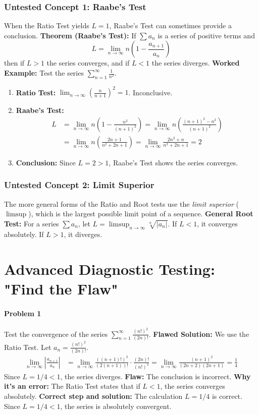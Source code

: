 \documentclass{article}
\begin{document}
\section{Untested Concept 1: Raabe's Test}
When the Ratio Test yields $L=1$, Raabe's Test can sometimes provide a conclusion.
\textbf{Theorem (Raabe's Test):} If $\sum a_n$ is a series of positive terms and
\[ L = \lim_{n \to \infty} n \left( 1 - \frac{a_{n+1}}{a_n} \right) \]
then if $L > 1$ the series converges, and if $L < 1$ the series diverges.
\textbf{Worked Example:} Test the series $\sum_{n=1}^{\infty} \frac{1}{n^2}$.
\begin{enumerate}
    \item \textbf{Ratio Test:} $\lim_{n \to \infty} (\frac{n}{n+1})^2 = 1$. Inconclusive.
    \item \textbf{Raabe's Test:}
    \begin{align*}
    L &= \lim_{n \to \infty} n \left( 1 - \frac{n^2}{(n+1)^2} \right) = \lim_{n \to \infty} n \left( \frac{(n+1)^2 - n^2}{(n+1)^2} \right) \\
    &= \lim_{n \to \infty} n \left( \frac{2n+1}{n^2+2n+1} \right) = \lim_{n \to \infty} \frac{2n^2+n}{n^2+2n+1} = 2
    \end{align*}
    \item \textbf{Conclusion:} Since $L=2 > 1$, Raabe's Test shows the series converges.
\end{enumerate}

\section{Untested Concept 2: Limit Superior}
The more general forms of the Ratio and Root tests use the \textit{limit superior} ($\limsup$), which is the largest possible limit point of a sequence.
\textbf{General Root Test:} For a series $\sum a_n$, let $L = \limsup_{n \to \infty} \sqrt[n]{|a_n|}$. If $L<1$, it converges absolutely. If $L>1$, it diverges.

\part{Advanced Diagnostic Testing: "Find the Flaw"}

\subsection*{Problem 1}
Test the convergence of the series $\sum_{n=1}^{\infty} \frac{(n!)^2}{(2n)!}$.
\textbf{Flawed Solution:}
We use the Ratio Test. Let $a_n = \frac{(n!)^2}{(2n)!}$.
\begin{align*}
\lim_{n \to \infty} \left| \frac{a_{n+1}}{a_n} \right| &= \lim_{n \to \infty} \frac{((n+1)!)^2}{(2(n+1))!} \cdot \frac{(2n)!}{(n!)^2} = \lim_{n \to \infty} \frac{(n+1)^2}{(2n+2)(2n+1)} = \frac{1}{4}
\end{align*}
Since $L = 1/4 < 1$, the series diverges.
\textbf{Flaw:} The conclusion is incorrect. \textbf{Why it's an error:} The Ratio Test states that if $L<1$, the series converges absolutely. \textbf{Correct step and solution:} The calculation $L=1/4$ is correct. Since $L=1/4 < 1$, the series is absolutely convergent.
\end{document}
